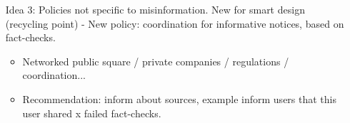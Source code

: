 \documentclass{article}
\begin{document}
{\begin{itemize}
%		
%		
%			
%	
	
\item[Idea 3:] Policies not specific to misinformation. New for smart design (recycling point) - New policy: coordination for informative notices, based on fact-checks.

	\begin{itemize}
	
		\item Networked public square / private companies / regulations / coordination... 
	
		\item Recommendation: inform about sources, example inform users that this user shared x failed fact-checks. 
		
		

\end{itemize}
\end{itemize}}
\end{document}
